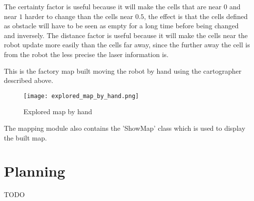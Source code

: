 The certainty factor is useful because it will make the cells that are near $0$ and near $1$ harder to change than the cells near $0.5$, the effect is that the cells defined as obstacle will have to be seen as empty for a long time before being changed and inversely.
The distance factor is useful because it will make the cells near the robot update more easily than the cells far away, since the further away the cell is from the robot the less precise the laser information is.

This is the factory map built moving the robot by hand using the cartographer described above.

\FloatBarrier
\begin{figure}
    \centering\texttt{[image: explored\_map\_by\_hand.png]}
    \label{fig:explored_map_by_hand}
    \caption{Explored map by hand}
\end{figure}
\FloatBarrier

The mapping module also contains the 'ShowMap' class which is used to display the built map.

\section{Planning}

TODO

